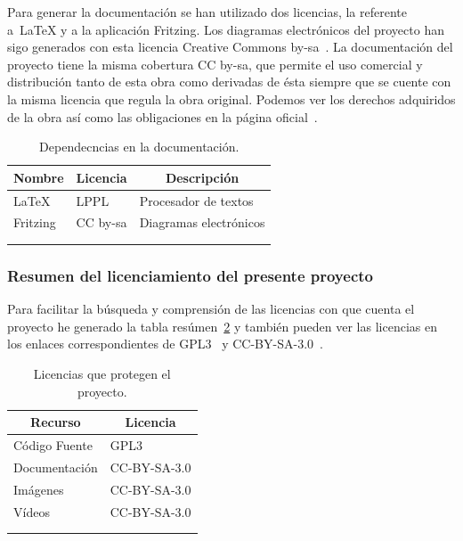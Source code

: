 Para generar la documentación se han utilizado dos licencias, la referente a~\LaTeX{} y a la aplicación Fritzing. Los diagramas electrónicos del proyecto han sigo generados con esta licencia Creative Commons by-sa~\cite{lic:CCbysa3}. La documentación del proyecto tiene la misma cobertura CC by-sa, que permite el uso comercial y distribución tanto de esta obra como derivadas de ésta siempre que se cuente con la misma licencia que regula la obra original. Podemos ver los derechos adquiridos de la obra así como las obligaciones en la página oficial~\cite{lic:CCbysa3}.

\begin{longtable}[c]{@{}lll@{}}
\toprule
\multicolumn{1}{c}{\textbf{Nombre}} & \multicolumn{1}{c}{\textbf{Licencia}} & \multicolumn{1}{c}{\textbf{Descripción}} \\* \midrule
\endfirsthead
%
\endhead
%
\bottomrule
\endfoot
%
\endlastfoot
%
\LaTeX{}~\cite{wiki:latex} & LPPL & Procesador de textos \\
Fritzing & CC by-sa & Diagramas electrónicos \\* \bottomrule \\
\caption{Dependecncias en la documentación.}
\label{tab:my-table}\\
\end{longtable}


\subsubsection{Resumen del licenciamiento del presente proyecto}
Para facilitar la búsqueda y comprensión de las licencias con que cuenta el proyecto he generado la tabla resúmen~\ref{tab:licproy} y también pueden ver las licencias en los enlaces correspondientes de GPL3~\cite{lic:GPL3} y CC-BY-SA-3.0~\cite{lic:CCbysa3}.

\begin{longtable}[c]{@{}ll@{}}
\toprule
\multicolumn{1}{c}{\textbf{Recurso}} & \multicolumn{1}{c}{\textbf{Licencia}} \\* \midrule
\endfirsthead
%
\endhead
%
\bottomrule
\endfoot
%
\endlastfoot
%
Código Fuente & GPL3 \\
Documentación & CC-BY-SA-3.0 \\
Imágenes & CC-BY-SA-3.0 \\
Vídeos & CC-BY-SA-3.0 \\* \bottomrule \\
\caption{Licencias que protegen el proyecto.}
\label{tab:licproy}\\
\end{longtable}


